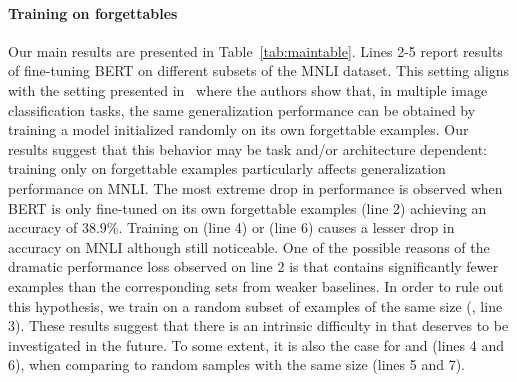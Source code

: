 
\paragraph{Training on forgettables} 
Our main results are presented in Table~\ref{tab:maintable}. Lines 2-5 report results of fine-tuning BERT on different subsets of the MNLI dataset. This setting aligns with the setting presented in~\citet{toneva2018empirical} where the authors show that, in multiple image classification tasks, the same generalization performance can be obtained by training a model initialized randomly on its own forgettable examples. Our results suggest that this behavior may be task and/or architecture dependent: training only on forgettable examples particularly affects generalization performance on MNLI. The most extreme drop in performance is observed when BERT is only fine-tuned on its own forgettable examples \fbert (line 2) achieving an accuracy of 38.9\%. Training on \flstm (line 4) or \fbow (line 6) causes a lesser drop in accuracy on MNLI although still noticeable. One of the possible reasons of the dramatic performance loss observed on line 2 is that \fbert contains significantly fewer examples than the corresponding sets from weaker baselines.
In order to rule out this hypothesis, we train on a random subset of examples of the same size (\balancedbert, line 3). These results suggest that there is an intrinsic difficulty in \fbert that deserves to be investigated in the future.
To some extent, it is also the case for \flstm and \fbow (lines 4 and 6), when comparing to random samples with the same size (lines 5 and 7).


